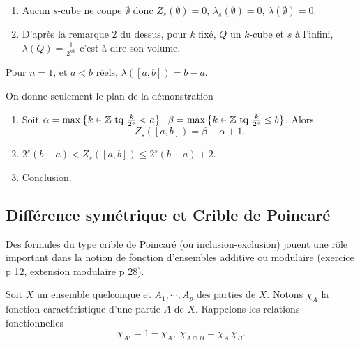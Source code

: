 \begin{rems}
 \begin{enumerate}
  \item Aucun $s$-cube ne coupe $\emptyset$ donc $Z_s(\emptyset)=0$, $\lambda_s(\emptyset)=0$, $\lambda(\emptyset)=0$.
  \item D'après la remarque 2 du dessus, pour $k$ fixé, $Q$ un $k$-cube et $s$ à l'infini, $\lambda(Q)= \frac{1}{2^{nk}}$ c'est à dire son volume.
 \end{enumerate}

 \begin{propn}
  Pour $n=1$, et $a < b$ réels, $\lambda([a,b]) = b - a$.
 \end{propn}
 \begin{demo}
  On donne seulement le plan de la démonstration
  \begin{enumerate}
   \item Soit $\alpha = \max \left\lbrace k \in \mathbb{Z} \text{ tq } \frac{k}{2^s} < a\right\rbrace$, $\beta = \max \left\lbrace k \in \mathbb{Z} \text{ tq } \frac{k}{2^s} \leq b\right\rbrace$. Alors
   \begin{displaymath}
    Z_s([a,b]) = \beta - \alpha + 1.
   \end{displaymath}
   \item $2^s(b-a) < Z_s([a,b]) \leq 2^s(b-a) + 2$.
   \item Conclusion.
  \end{enumerate}
 \end{demo}
\end{rems}


\subsection{Différence symétrique et Crible de Poincaré}\label{criblePoinc}
Des formules du type crible de Poincaré (ou inclusion-exclusion) jouent une rôle important dans la notion de fonction d'ensembles additive ou modulaire (exercice p 12, extension modulaire p 28).

\noindent Soit $X$ un ensemble quelconque et $A_1, \cdots, A_p$ des parties de $X$. Notons $\chi_A$ la fonction caractéristique d'une partie $A$ de $X$. Rappelons les relations fonctionnelles
\begin{displaymath}
  \chi_{A'} = 1 - \chi_A, \; \chi_{A \cap B} = \chi_A \, \chi_B.
\end{displaymath}

